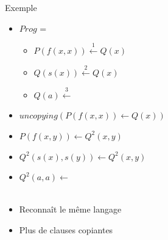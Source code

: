 \documentclass[xcolor={dvipsnames}]{beamer}
\begin{document}
\begin{frame}{Exemple}
  \begin{itemize}[<+->]
  \item $Prog$ =
    \begin{itemize}
    \item $P(f(x,x)) \stackrel{1}{\leftarrow} Q(x)$
    \item {}$Q(s(x)) \stackrel{2}{\leftarrow} Q(x)$
    \item {}$Q(a) \stackrel{3}{\leftarrow} $
    \end{itemize}
    \vspace{\baselineskip}

  \item $uncopying(P(f(x,x)) \leftarrow Q(x))$
  \item $P(f(x,y)) \leftarrow Q^2(x, y)$
  \item $Q^2(s(x),s(y)) \leftarrow Q^2(x,y)$
  \item $Q^2(a,a) \leftarrow $ \\~

  \item Reconnaît le même langage
  \item Plus de clauses copiantes
  \end{itemize}
    
\end{frame}
\end{document}
